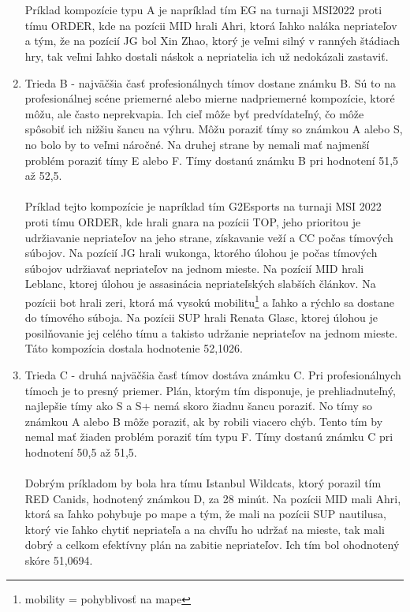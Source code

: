 \begin{enumerate}
	\\  \\Príklad kompozície typu A je napríklad tím EG na turnaji MSI2022 proti tímu ORDER, kde na pozícii MID hrali Ahri, ktorá ľahko naláka nepriateľov a tým, že na pozícií JG bol Xin Zhao, ktorý je veľmi silný v ranných štádiach hry, tak veľmi ľahko dostali náskok a nepriatelia ich už nedokázali zastaviť.
	\\
	\item Trieda B  - najväčšia časť profesionálnych tímov dostane známku B. Sú to na profesionálnej scéne priemerné alebo mierne nadpriemerné kompozície, ktoré môžu, ale často neprekvapia. Ich cieľ môže byť predvídateľný, čo môže spôsobiť ich nižšiu šancu na výhru. Môžu poraziť tímy so známkou A alebo S, no bolo by to veľmi náročné. Na druhej strane by nemali mať najmenší problém poraziť tímy E alebo F. Tímy dostanú známku B pri hodnotení 51,5 až 52,5.
	\\ \\
	Príklad tejto kompozície je napríklad tím G2Esports na turnaji MSI 2022 proti tímu ORDER, kde hrali gnara na pozícii TOP, jeho prioritou je udržiavanie nepriateľov na jeho strane, získavanie veží a CC počas tímových súbojov. Na pozícií JG hrali wukonga, ktorého úlohou je počas tímových súbojov udržiavať nepriateľov na jednom mieste. Na pozícií MID hrali Leblanc, ktorej úlohou je assasinácia nepriateľských slabších článkov. Na pozícii bot hrali zeri, ktorá má vysokú mobilitu\footnote{mobility = pohyblivosť na mape} a ľahko a rýchlo sa dostane do tímového súboja. Na pozícii SUP hrali Renata Glasc, ktorej úlohou je posilňovanie jej celého tímu a takisto udržanie nepriateľov na jednom mieste. Táto kompozícia dostala hodnotenie 52,1026. 
	\\
	\item Trieda C  - druhá najväčšia časť tímov dostáva známku C. Pri profesionálnych tímoch je to presný priemer. Plán, ktorým tím disponuje, je prehliadnuteľný, najlepšie tímy ako S a S+ nemá skoro žiadnu šancu poraziť. No tímy so známkou A alebo B môže poraziť, ak by robili viacero chýb. Tento tím  by nemal mať žiaden problém poraziť tím typu F. Tímy dostanú známku C pri hodnotení 50,5 až 51,5.
	\\ \\ Dobrým príkladom by bola hra tímu Istanbul Wildcats, ktorý porazil tím RED Canids, hodnotený známkou D, za 28 minút. Na pozícii MID mali Ahri, ktorá sa ľahko pohybuje po mape a tým, že mali na pozícii SUP nautilusa, ktorý vie ľahko chytiť nepriateľa a na chvíľu ho udržať na mieste, tak mali dobrý a celkom efektívny plán na zabitie nepriateľov. Ich tím bol ohodnotený skóre 51,0694.

\end{enumerate}
